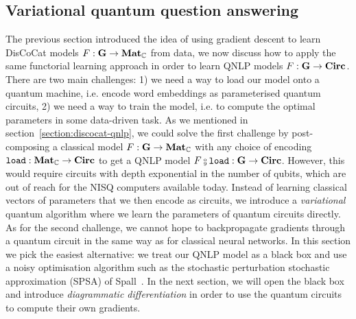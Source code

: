 
\subsection{Variational quantum question answering}

The previous section introduced the idea of using gradient descent to learn DisCoCat models $F : \mathbf{G} \to \mathbf{Mat}_{\mathbb{C}}$ from data, we now discuss how to apply the same functorial learning approach in order to learn QNLP models $F : \mathbf{G} \to \mathbf{Circ}$.
There are two main challenges: 1) we need a way to load our model onto a quantum machine, i.e. encode word embeddings as parameterised quantum circuits, 2) we need a way to train the model, i.e. to compute the optimal parameters in some data-driven task.
As we mentioned in section~\ref{section:discocat-qnlp}, we could solve the first challenge by post-composing a classical model $F : \mathbf{G} \to \mathbf{Mat}_{\mathbb{C}}$ with any choice of encoding $\mathtt{load} : \mathbf{Mat}_{\mathbb{C}} \to \mathbf{Circ}$ to get a QNLP model $F \fcmp \mathtt{load} : \G \to \mathbf{Circ}$.
However, this would require circuits with depth exponential in the number of qubits, which are out of reach for the NISQ computers available today.
Instead of learning classical vectors of parameters that we then encode as circuits, we introduce a \emph{variational} quantum algorithm where we learn the parameters of quantum circuits directly.
As for the second challenge, we cannot hope to backpropagate gradients through a quantum circuit in the same way as for classical neural networks.
In this section we pick the easiest alternative: we treat our QNLP model as a black box and use a noisy optimisation algorithm such as the stochastic perturbation stochastic approximation (SPSA) of Spall~\cite{Spall98}.
In the next section, we will open the black box and introduce \emph{diagrammatic differentiation} in order to use the quantum circuits to compute their own gradients.

